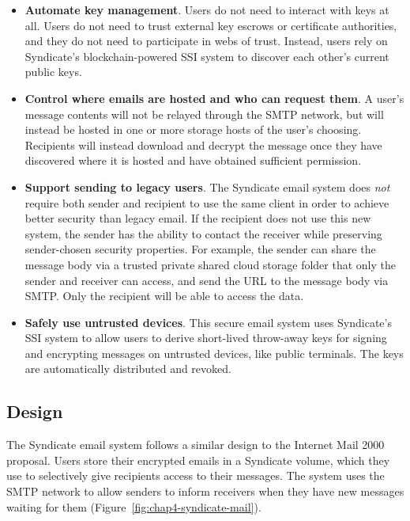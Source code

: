 \begin{itemize}
\item \textbf{Automate key management}.  Users do not need to interact with keys
at all.  Users do not need to trust external key escrows or certificate
authorities, and they do not need to participate in webs of trust.  Instead,
users rely on Syndicate's blockchain-powered SSI system to discover each other's
current public keys.

\item \textbf{Control where emails are hosted and who can request them}.
A user's message contents will
not be relayed through the SMTP network, but will instead be hosted in one or
more storage hosts of the user's choosing.  Recipients will instead download and
decrypt the message once they have discovered where it is hosted and have
obtained sufficient permission.

\item \textbf{Support sending to legacy users}.  The Syndicate email system does \emph{not}
require both sender and recipient to use the same client in order to achieve
better security than legacy email.  If the recipient does not use this new system, the sender has
the ability to contact the receiver while
preserving sender-chosen security properties.  For example, 
the sender can share the message body via a trusted private shared cloud storage folder
that only the sender and receiver can access, and send the URL to the message
body via SMTP.  Only the recipient will be able to access the data.

\item \textbf{Safely use untrusted devices}.  This secure email system uses Syndicate's SSI system to
allow users to derive short-lived throw-away keys for signing and encrypting
messages on untrusted devices, like public terminals.  The keys are
automatically distributed and revoked.
\end{itemize}

\subsection{Design}

The Syndicate email system follows a similar design to the Internet Mail
2000~\cite{internet-mail-2000} proposal.  Users store their
encrypted emails in a Syndicate volume, which they
use to selectively give recipients access to their messages.  The system uses
the SMTP network to allow senders to inform receivers when they have new
messages waiting for them (Figure~\ref{fig:chap4-syndicate-mail}).

